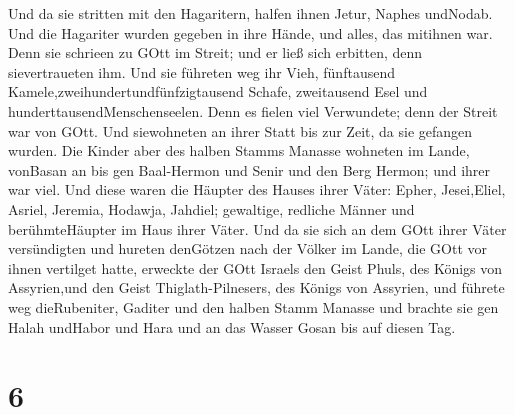  Und da sie stritten mit den Hagaritern, halfen ihnen
Jetur, Naphes undNodab.  Und die Hagariter wurden gegeben
in ihre Hände, und alles, das mitihnen war. Denn sie schrieen zu GOtt im
Streit; und er ließ sich erbitten, denn sievertraueten ihm.
 Und sie führeten weg ihr Vieh, fünftausend
Kamele,zweihundertundfünfzigtausend Schafe, zweitausend Esel und
hunderttausendMenschenseelen.  Denn es fielen viel
Verwundete; denn der Streit war von GOtt. Und siewohneten an ihrer Statt
bis zur Zeit, da sie gefangen wurden.  Die Kinder aber des
halben Stamms Manasse wohneten im Lande, vonBasan an bis gen Baal-Hermon
und Senir und den Berg Hermon; und ihrer war viel.  Und
diese waren die Häupter des Hauses ihrer Väter: Epher, Jesei,Eliel,
Asriel, Jeremia, Hodawja, Jahdiel; gewaltige, redliche Männer und
berühmteHäupter im Haus ihrer Väter.  Und da sie sich an
dem GOtt ihrer Väter versündigten und hureten denGötzen nach der Völker
im Lande, die GOtt vor ihnen vertilget hatte,  erweckte der
GOtt Israels den Geist Phuls, des Königs von Assyrien,und den Geist
Thiglath-Pilnesers, des Königs von Assyrien, und führete weg
dieRubeniter, Gaditer und den halben Stamm Manasse und brachte sie gen
Halah undHabor und Hara und an das Wasser Gosan bis auf diesen Tag.

\hypertarget{section-5}{%
\section{6}\label{section-5}}

